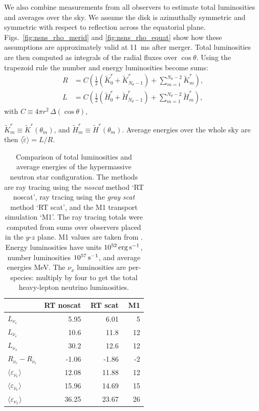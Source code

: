 \documentclass[aps,floatfix,prd,superscriptaddress,twocolumn]{revtex4-1}
\newcommand{\todo}[1]{\marginpar{\tiny{\textcolor{red}{#1}}}}
\renewcommand\todo[1]{} %
\begin{document}
We also combine measurements from all observers to estimate
total luminosities and averages over the sky.
We assume the disk is azimuthally symmetric and
symmetric with respect to reflection across the equatorial plane.
Figs.~\ref{fig:nsns_rho_merid} and \ref{fig:nsns_rho_equat} show how these
assumptions are approximately valid at 11~ms after merger.
Total luminosities are then computed as integrals of the radial fluxes
over $\cos\theta$.
Using the trapezoid rule the number and energy luminosities become sums:
\begin{align}
  \label{eqn:luminosity_R}
  R &= C
  \left(\frac{1}{2}(\tilde{K}^r_0+\tilde{K}^r_{N_\theta-1})
  +\sum\limits_{m=1}^{N_\theta-2}\tilde{K}^r_m\right),\\
  \label{eqn:luminosity_L}
  L &= C
  \left(\frac{1}{2}(\tilde{H}^r_0+\tilde{H}^r_{N_\theta-1})
  +\sum\limits_{m=1}^{N_\theta-2}\tilde{H}^r_m\right),
\end{align}
with $C \equiv 4\pi r^2\, \Delta(\cos \theta)$,
\todo{source of GR error in coordinate $r$}
$\tilde{K}^r_m \equiv \tilde{K}^r(\theta_m)$, and
$\tilde{H}^r_m \equiv \tilde{H}^r(\theta_m)$.
Average energies over the whole sky are then
$\langle\tilde{\varepsilon}\rangle=L/R$.

\begin{table}%
  \caption{
    Comparison of total luminosities and average energies
    of the hypermassive neutron star configuration.
    The methods are ray tracing using the \emph{noscat} method `RT noscat',
    ray tracing using the \emph{gray} \emph{scat} method `RT scat',
    and the M1 transport simulation `M1'.
    The ray tracing totals were computed from sums over
    observers placed in the $y$-$z$ plane.
    M1 values are taken from \cite[Figs. 7, 9, 10]{fouc2016-m1_evolve_n}.
    Energy luminosities have units $10^{52}\,{\rm erg}\,{\rm s}^{-1}$,
    number luminosities $10^{57}\,{\rm s}^{-1}$, and
    average energies MeV.
    The $\nu_x$ luminosities are per-species:
    multiply by four to get the total heavy-lepton neutrino luminosities.
  }
  \label{tab:nsns_rt_vs_m1}
  \begin{tabularx}{\columnwidth}{X r r r}
    & {\bf RT noscat} & \,\,{\bf RT scat} & \,\,{\bf M1} \\
    \hline
    $L_{\nu_e}$                                 & 5.95 & 6.01 & 5 \\
    $L_{\bar{\nu}_e}$                           & 10.6 & 11.8 & 12 \\
    $L_{\nu_x}$                                 & 30.2 & 12.6 & 12 \\
    $R_{\nu_e}-R_{\bar{\nu}_e}$                 & -1.06 & -1.86 & -2 \\
    $\langle \varepsilon_{\nu_e} \rangle$       & 12.08 & 11.88 & 12 \\
    $\langle \varepsilon_{\bar{\nu}_e} \rangle$ & 15.96 & 14.69 & 15 \\
    $\langle \varepsilon_{\nu_x} \rangle$       & 36.25 & 23.67 & 26 \\
    \hline
  \end{tabularx}
\end{table}
\end{document}
